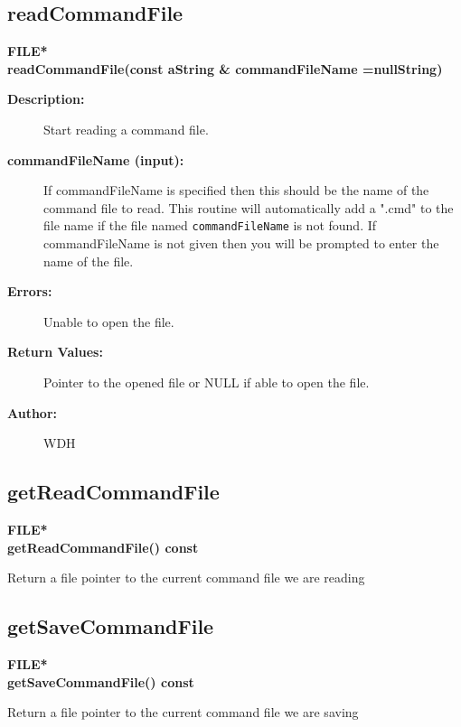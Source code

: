 \subsection{readCommandFile}
 
\begin{flushleft} \textbf{%
FILE*  \\ 
\settowidth{\GenericGraphicsInterfaceIncludeArgIndent}{readCommandFile(}%
readCommandFile(const aString \& commandFileName  =nullString)
}\end{flushleft}
\begin{description}
\item[{\bf Description:}] 
    Start reading a command file. 
\item[{\bf commandFileName (input):}] 
    If {\ff commandFileName} is specified
    then this should be the name of the command file to read. This routine
    will automatically add a ".cmd" to the file name if the
    file named {\tt commandFileName} is not found.
    If  {\ff commandFileName} is not given then
    you will be prompted to enter the name of the file.
\item[{\bf Errors:}]   Unable to open the file.
\item[{\bf Return Values:}]  Pointer to the opened file or NULL if able to open the file.

\item[{\bf Author:}]  WDH
\end{description}
\subsection{getReadCommandFile}
 
\begin{flushleft} \textbf{%
FILE*  \\ 
\settowidth{\GenericGraphicsInterfaceIncludeArgIndent}{getReadCommandFile(}%
getReadCommandFile() const
}\end{flushleft}
   Return a file pointer to the current command file we are reading
 
\subsection{getSaveCommandFile}
 
\begin{flushleft} \textbf{%
FILE*  \\ 
\settowidth{\GenericGraphicsInterfaceIncludeArgIndent}{getSaveCommandFile(}%
getSaveCommandFile() const
}\end{flushleft}
   Return a file pointer to the current command file we are saving
 
